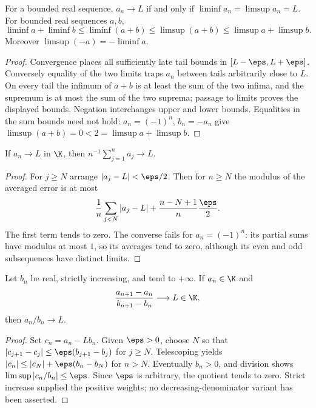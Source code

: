 \begin{theorem}
For a bounded real sequence, $a_n\to L$ if and only if $\liminf a_n=\limsup a_n=L$. For bounded real sequences $a,b$,
\[ \liminf a+\liminf b\le\liminf(a+b)\le\limsup(a+b)\le\limsup a+\limsup b. \]
Moreover $\limsup(-a)=-\liminf a$.
\end{theorem}
\begin{proof}
Convergence places all sufficiently late tail bounds in $[L-\eps,L+\eps]$. Conversely equality of the two limits traps $a_n$ between tails arbitrarily close to $L$. On every tail the infimum of $a+b$ is at least the sum of the two infima, and the supremum is at most the sum of the two suprema; passage to limits proves the displayed bounds. Negation interchanges upper and lower bounds. Equalities in the sum bounds need not hold: $a_n=(-1)^n$, $b_n=-a_n$ give $\limsup(a+b)=0<2=\limsup a+\limsup b$.
\end{proof}

\begin{theorem}
If $a_n\to L$ in $\K$, then $n^{-1}\sum_{j=1}^n a_j\to L$.
\end{theorem}
\begin{proof}
For $j\ge N$ arrange $|a_j-L|<\eps/2$. Then for $n\ge N$ the modulus of the averaged error is at most
\[ \frac1n\sum_{j<N}|a_j-L|+\frac{n-N+1}{n}\frac\eps2. \]
The first term tends to zero. The converse fails for $a_n=(-1)^n$: its partial sums have modulus at most $1$, so its averages tend to zero, although its even and odd subsequences have distinct limits.
\end{proof}

\begin{theorem}
Let $b_n$ be real, strictly increasing, and tend to $+\infty$. If $a_n\in\K$ and
\[ \frac{a_{n+1}-a_n}{b_{n+1}-b_n}\longrightarrow L\in\K, \]
then $a_n/b_n\to L$.
\end{theorem}
\begin{proof}
Set $c_n=a_n-Lb_n$. Given $\eps>0$, choose $N$ so that $|c_{j+1}-c_j|\le\eps(b_{j+1}-b_j)$ for $j\ge N$. Telescoping yields $|c_n|\le|c_N|+\eps(b_n-b_N)$ for $n>N$. Eventually $b_n>0$, and division shows $\limsup |c_n/b_n|\le\eps$. Since $\eps$ is arbitrary, the quotient tends to zero. Strict increase supplied the positive weights; no decreasing-denominator variant has been asserted.
\end{proof}

